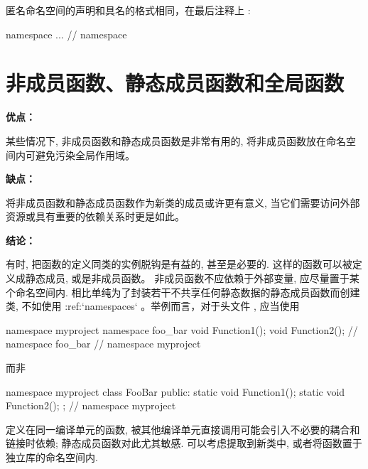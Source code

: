 匿名命名空间的声明和具名的格式相同，在最后注释上  :

\begin{cppcode}
namespace {
...
}  // namespace
\end{cppcode}

\section{非成员函数、静态成员函数和全局函数} \label{nonmember-static-member-and-global-functions}


\textbf{优点：}

某些情况下, 非成员函数和静态成员函数是非常有用的, 将非成员函数放在命名空间内可避免污染全局作用域。

\textbf{缺点：}

将非成员函数和静态成员函数作为新类的成员或许更有意义, 当它们需要访问外部资源或具有重要的依赖关系时更是如此。

\textbf{结论：}

有时, 把函数的定义同类的实例脱钩是有益的, 甚至是必要的. 这样的函数可以被定义成静态成员, 或是非成员函数。
非成员函数不应依赖于外部变量, 应尽量置于某个命名空间内. 相比单纯为了封装若干不共享任何静态数据的静态成员函数而创建类, 不如使用
:ref:`namespaces` 。举例而言，对于头文件   , 应当使用

\begin{cppcode}
  namespace myproject {
  namespace foo_bar {
  void Function1();
  void Function2();
  }  // namespace foo_bar
  }  // namespace myproject
\end{cppcode}

而非

\begin{cppcode}
  namespace myproject {
      class FooBar {
          public:
          static void Function1();
          static void Function2();
        };
    }  // namespace myproject
\end{cppcode}

定义在同一编译单元的函数, 被其他编译单元直接调用可能会引入不必要的耦合和链接时依赖; 静态成员函数对此尤其敏感. 可以考虑提取到新类中,
或者将函数置于独立库的命名空间内.

